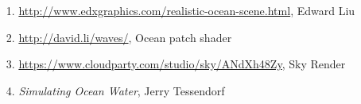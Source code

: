 \documentclass{jcgt}
\begin{document}
\begin{itemize}
\item[1.]\href{http://www.edxgraphics.com/realistic-ocean-scene.html}{http://www.edxgraphics.com/realistic-ocean-scene.html}, Edward Liu
\label{reference:ref1}
\item[2.]\href{http://david.li/waves/}{http://david.li/waves/}, Ocean patch shader
\label{reference:ref2}
\item[3.]\href{https://www.cloudparty.com/studio/sky/ANdXh48Zy}{https://www.cloudparty.com/studio/sky/ANdXh48Zy}, Sky Render
\item[4.]\textit{Simulating Ocean Water}, Jerry Tessendorf

\end{itemize}



%


\end{document}
